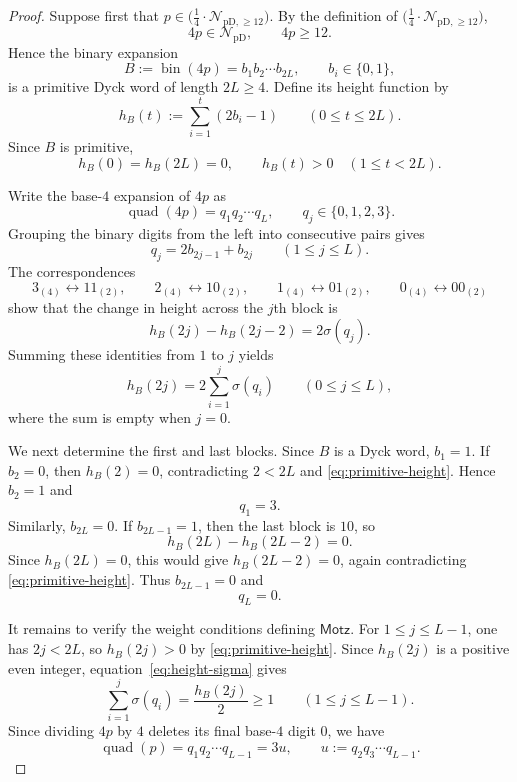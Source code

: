 \documentclass[12pt]{article}
\theoremstyle{plain}
\theoremstyle{definition}
\theoremstyle{plain}
\newcommand{\NpD}{\mathcal{N}_{\mathrm{pD}}}
\newcommand{\Pset}{%
  \bigl(\tfrac{1}{4}\cdot\mathcal{N}_{\mathrm{pD},\geq 12}\bigr)%
}
\begin{document}
\begin{proof}
Suppose first that $p\in\Pset$.  By the definition of $\Pset$,
\[
 4p\in\NpD,\qquad 4p\geq12.
\]
Hence the binary expansion
\[
 B:=\operatorname{bin}(4p)=b_1b_2\cdots b_{2L},
 \qquad b_i\in\{0,1\},
\]
is a primitive Dyck word of length $2L\geq4$.  Define its height function by
\[
 h_B(t):=\sum_{i=1}^{t}(2b_i-1)
 \qquad(0\leq t\leq2L).
\]
Since $B$ is primitive,
\begin{equation}\label{eq:primitive-height}
 h_B(0)=h_B(2L)=0,
 \qquad
 h_B(t)>0\quad(1\leq t<2L).
\end{equation}

Write the base-$4$ expansion of $4p$ as
\[
 \operatorname{quad}(4p)=q_1q_2\cdots q_L,
 \qquad q_j\in\{0,1,2,3\}.
\]
Grouping the binary digits from the left into consecutive pairs gives
\[
 q_j=2b_{2j-1}+b_{2j}
 \qquad(1\leq j\leq L).
\]
The correspondences
\[
 3_{(4)}\longleftrightarrow11_{(2)},\qquad
 2_{(4)}\longleftrightarrow10_{(2)},\qquad
 1_{(4)}\longleftrightarrow01_{(2)},\qquad
 0_{(4)}\longleftrightarrow00_{(2)}
\]
show that the change in height across the $j$th block is
\[
 h_B(2j)-h_B(2j-2)=2\sigma(q_j).
\]
Summing these identities from $1$ to $j$ yields
\begin{equation}\label{eq:height-sigma}
 h_B(2j)=2\sum_{i=1}^{j}\sigma(q_i)
 \qquad(0\leq j\leq L),
\end{equation}
where the sum is empty when $j=0$.

We next determine the first and last blocks.  Since $B$ is a Dyck word,
$b_1=1$.  If $b_2=0$, then $h_B(2)=0$, contradicting
$2<2L$ and \eqref{eq:primitive-height}.  Hence $b_2=1$ and
\[
 q_1=3.
\]
Similarly, $b_{2L}=0$.  If $b_{2L-1}=1$, then the last block is $10$, so
\[
 h_B(2L)-h_B(2L-2)=0.
\]
Since $h_B(2L)=0$, this would give $h_B(2L-2)=0$, again contradicting
\eqref{eq:primitive-height}.  Thus $b_{2L-1}=0$ and
\[
 q_L=0.
\]

It remains to verify the weight conditions defining $\mathsf{Motz}$.
For $1\leq j\leq L-1$, one has $2j<2L$, so
$h_B(2j)>0$ by \eqref{eq:primitive-height}.  Since $h_B(2j)$ is a positive
even integer, equation~\eqref{eq:height-sigma} gives
\begin{equation}\label{eq:prefix-height}
 \sum_{i=1}^{j}\sigma(q_i)
 =\frac{h_B(2j)}{2}
 \geq1
 \qquad(1\leq j\leq L-1).
\end{equation}
Since dividing $4p$ by $4$ deletes its final base-$4$ digit $0$, we have
\[
 \operatorname{quad}(p)=q_1q_2\cdots q_{L-1}=3u,
 \qquad
 u:=q_2q_3\cdots q_{L-1}.
\]


\end{proof}
\end{document}
